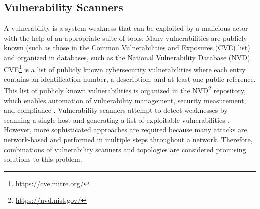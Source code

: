 \subsection{Vulnerability Scanners}
\label{chap:vulnerability_scanners}

 A vulnerability is a system weakness that can be exploited by a malicious actor with the help of an appropriate suite of tools. Many vulnerabilities are publicly known (such as those in the Common Vulnerabilities and Exposures (CVE) list) and organized in databases, such as the National Vulnerability Database (NVD). CVE\footnote{\url{https://cve.mitre.org/}} is a list of publicly known cybersecurity vulnerabilities where each entry contains an identification number, a description, and at least one public reference. This list of publicly known vulnerabilities is organized in the  NVD\footnote{\url{https://nvd.nist.gov/}} repository, which enables automation of vulnerability management, security measurement, and compliance \cite{booth2013national}. Vulnerability scanners attempt to detect weaknesses by scanning a single host and generating a list of exploitable vulnerabilities \cite{deraison1999nessus, farmer1990cops}. However, more sophisticated approaches are required because many attacks are network-based and performed in multiple steps throughout a network. Therefore, combinations of vulnerability scanners and topologies are considered promising solutions to this problem\cite{sheyner2002automated, ingols2006practical}.
